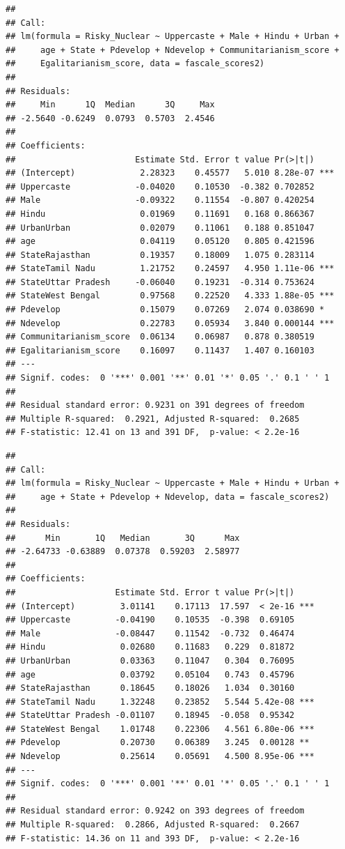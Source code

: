 \documentclass[
]{article}
\begin{document}
\begin{verbatim}
## 
## Call:
## lm(formula = Risky_Nuclear ~ Uppercaste + Male + Hindu + Urban + 
##     age + State + Pdevelop + Ndevelop + Communitarianism_score + 
##     Egalitarianism_score, data = fascale_scores2)
## 
## Residuals:
##     Min      1Q  Median      3Q     Max 
## -2.5640 -0.6249  0.0793  0.5703  2.4546 
## 
## Coefficients:
##                        Estimate Std. Error t value Pr(>|t|)    
## (Intercept)             2.28323    0.45577   5.010 8.28e-07 ***
## Uppercaste             -0.04020    0.10530  -0.382 0.702852    
## Male                   -0.09322    0.11554  -0.807 0.420254    
## Hindu                   0.01969    0.11691   0.168 0.866367    
## UrbanUrban              0.02079    0.11061   0.188 0.851047    
## age                     0.04119    0.05120   0.805 0.421596    
## StateRajasthan          0.19357    0.18009   1.075 0.283114    
## StateTamil Nadu         1.21752    0.24597   4.950 1.11e-06 ***
## StateUttar Pradesh     -0.06040    0.19231  -0.314 0.753624    
## StateWest Bengal        0.97568    0.22520   4.333 1.88e-05 ***
## Pdevelop                0.15079    0.07269   2.074 0.038690 *  
## Ndevelop                0.22783    0.05934   3.840 0.000144 ***
## Communitarianism_score  0.06134    0.06987   0.878 0.380519    
## Egalitarianism_score    0.16097    0.11437   1.407 0.160103    
## ---
## Signif. codes:  0 '***' 0.001 '**' 0.01 '*' 0.05 '.' 0.1 ' ' 1
## 
## Residual standard error: 0.9231 on 391 degrees of freedom
## Multiple R-squared:  0.2921, Adjusted R-squared:  0.2685 
## F-statistic: 12.41 on 13 and 391 DF,  p-value: < 2.2e-16
\end{verbatim}

\begin{verbatim}
## 
## Call:
## lm(formula = Risky_Nuclear ~ Uppercaste + Male + Hindu + Urban + 
##     age + State + Pdevelop + Ndevelop, data = fascale_scores2)
## 
## Residuals:
##      Min       1Q   Median       3Q      Max 
## -2.64733 -0.63889  0.07378  0.59203  2.58977 
## 
## Coefficients:
##                    Estimate Std. Error t value Pr(>|t|)    
## (Intercept)         3.01141    0.17113  17.597  < 2e-16 ***
## Uppercaste         -0.04190    0.10535  -0.398  0.69105    
## Male               -0.08447    0.11542  -0.732  0.46474    
## Hindu               0.02680    0.11683   0.229  0.81872    
## UrbanUrban          0.03363    0.11047   0.304  0.76095    
## age                 0.03792    0.05104   0.743  0.45796    
## StateRajasthan      0.18645    0.18026   1.034  0.30160    
## StateTamil Nadu     1.32248    0.23852   5.544 5.42e-08 ***
## StateUttar Pradesh -0.01107    0.18945  -0.058  0.95342    
## StateWest Bengal    1.01748    0.22306   4.561 6.80e-06 ***
## Pdevelop            0.20730    0.06389   3.245  0.00128 ** 
## Ndevelop            0.25614    0.05691   4.500 8.95e-06 ***
## ---
## Signif. codes:  0 '***' 0.001 '**' 0.01 '*' 0.05 '.' 0.1 ' ' 1
## 
## Residual standard error: 0.9242 on 393 degrees of freedom
## Multiple R-squared:  0.2866, Adjusted R-squared:  0.2667 
## F-statistic: 14.36 on 11 and 393 DF,  p-value: < 2.2e-16
\end{verbatim}
\end{document}
